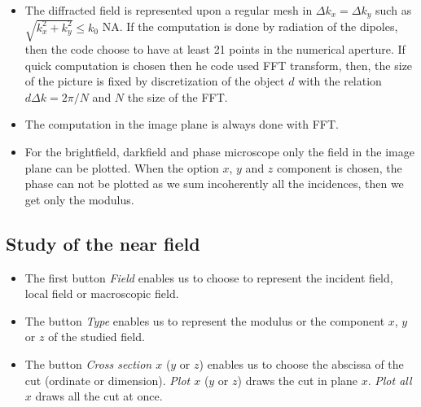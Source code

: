 \begin{itemize}


\item The diffracted field is represented upon a regular mesh in
  $\Delta k_x=\Delta k_y$ such as $\sqrt{k_x^2+k_y^2} \le k_0$ NA. If
  the computation is done by radiation of the dipoles, then the code
  choose to have at least 21 points in the numerical aperture.  If
  quick computation is chosen then he code used FFT transform, then,
  the size of the picture is fixed by discretization of the object $d$
  with the relation $d \Delta k=2\pi/N$ and $N$ the size of the FFT.

  \item The computation in the image plane is always done with FFT.


\item For the brightfield, darkfield and phase microscope only the
  field in the image plane can be plotted. When the option $x$, $y$ and
  $z$ component is chosen, the phase can not be plotted as we sum
  incoherently all the incidences, then we get only the modulus.


\end{itemize}


\subsection{Study of the near field}

\begin{itemize}

\item The first button {\it Field} enables us to choose to represent
  the incident field, local field or macroscopic field.

\item The button {\it Type} enables us to represent the modulus or the 
component $x$, $y$ or $z$ of the studied field.

\item The button {\it Cross section $x$} ($y$ or $z$) enables us to
  choose the abscissa of the cut (ordinate or dimension). {\it Plot
    $x$} ($y$ or $z$) draws the cut in plane $x$. {\it Plot all $x$}
  draws all the cut at once.

\end{itemize}


